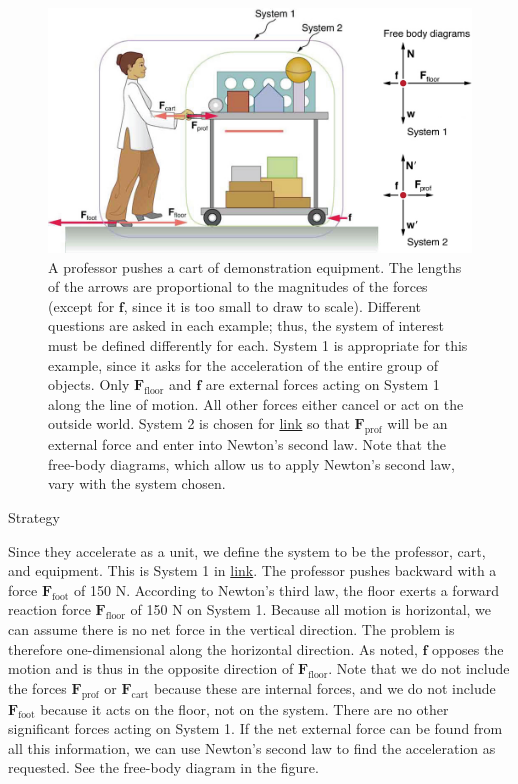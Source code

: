 \documentclass[
]{book}
\begin{document}
\begin{figure}
\hypertarget{import-auto-id2324690}{%
\centering
\includegraphics{images/Figure_04_04_02.jpg}
\caption{A professor pushes a cart of demonstration equipment. The lengths of
the arrows are proportional to the magnitudes of the forces (except for
\(\textbf{f}{}\), since it is too small to draw to scale). Different
questions are asked in each example; thus, the system of interest must
be defined differently for each. System 1 is appropriate for this
example, since it asks for the acceleration of the entire group of
objects. Only \(\textbf{F}_{\text{floor}}{}\) and \(\textbf{f}{}\) are
external forces acting on System 1 along the line of motion. All other
forces either cancel or act on the outside world. System 2 is chosen for
\protect\hyperlink{fs-id2092526}{link} so that
\(\textbf{F}_{\text{prof}}{}\) will be an external force and enter into
Newton's second law. Note that the free-body diagrams, which allow us to
apply Newton's second law, vary with the system
chosen.}\label{import-auto-id2324690}
}
\end{figure}

{Strategy}

Since they accelerate as a unit, we define the system to be the
professor, cart, and equipment. This is System 1 in
\protect\hyperlink{import-auto-id2324690}{link}. The professor
pushes backward with a force \(\textbf{F}_{\text{foot}}{}\) of 150 N.
According to Newton's third law, the floor exerts a forward reaction
force \(\textbf{F}_{\text{floor}}{}\) of 150 N on System 1. Because all
motion is horizontal, we can assume there is no net force in the
vertical direction. The problem is therefore one-dimensional along the
horizontal direction. As noted, \(\textbf{f}{}\) opposes the motion and is
thus in the opposite direction of
\emph{}\(\textbf{F}_{\text{floor}}{}\). Note that
we do not include the forces \(\textbf{F}_{\text{prof}}{}\) or
\(\textbf{F}_{\text{cart}}{}\) because these are internal forces, and we
do not include \(\textbf{F}_{\text{foot}}{}\) because it acts on the
floor, not on the system. There are no other significant forces acting
on System 1. If the net external force can be found from all this
information, we can use Newton's second law to find the acceleration as
requested. See the free-body diagram in the figure.
\end{document}
